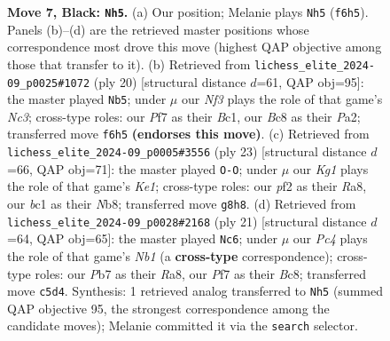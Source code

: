 \documentclass[11pt]{article}
\begin{document}
\begin{figure}[p]
\caption{\textbf{Move 7, Black: \texttt{Nh5}.} (a) Our position; Melanie plays \texttt{Nh5} (\texttt{f6h5}). Panels (b)--(d) are the retrieved master positions whose correspondence most drove this move (highest QAP objective among those that transfer to it). (b) Retrieved from \texttt{lichess\_elite\_2024-09\_p0025\#1072} (ply 20) [structural distance $d$=61, QAP obj=95]: the master played \texttt{Nb5}; under $\mu$ our \emph{Nf3} plays the role of that game's \emph{Nc3}; cross-type roles: our \emph{P}f7 as their \emph{B}c1, our \emph{B}c8 as their \emph{P}a2; transferred move \texttt{f6h5} \textbf{(endorses this move)}. (c) Retrieved from \texttt{lichess\_elite\_2024-09\_p0005\#3556} (ply 23) [structural distance $d$=66, QAP obj=71]: the master played \texttt{O-O}; under $\mu$ our \emph{Kg1} plays the role of that game's \emph{Ke1}; cross-type roles: our \emph{p}f2 as their \emph{R}a8, our \emph{b}c1 as their \emph{N}b8; transferred move \texttt{g8h8}. (d) Retrieved from \texttt{lichess\_elite\_2024-09\_p0028\#2168} (ply 21) [structural distance $d$=64, QAP obj=65]: the master played \texttt{Nc6}; under $\mu$ our \emph{Pc4} plays the role of that game's \emph{Nb1} (a \textbf{cross-type} correspondence); cross-type roles: our \emph{P}b7 as their \emph{R}a8, our \emph{P}f7 as their \emph{B}c8; transferred move \texttt{c5d4}. Synthesis: 1 retrieved analog transferred to \texttt{Nh5} (summed QAP objective 95, the strongest correspondence among the candidate moves); Melanie committed it via the \texttt{search} selector.}
\label{fig:thought-m13}
\end{figure}

\clearpage
\end{document}
